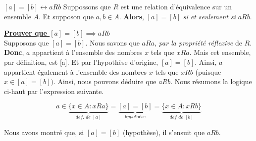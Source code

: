 \documentclass[16pt]{report}
\begin{document}
\begin{multicols*}{2}
            \begin{Theoremcon}{$[a] = [b]  \leftrightarrow aRb$ }
                Suppossons que $R$ est une relation d'équivalence sur un ensemble $A$. Et supposon que 
                $a, b \in A$. \textbf{Alors}, $[a] = [b]$ \textit{si et seulement si} $aRb$.     
            \end{Theoremcon}



                
            \begin{Preuve}{}{}
                \underline{\textbf{Prouver que $[a] = [b] \implies aRb$}}
                \vspace{1em}\\
                Supposons que $[a] = [b]$. Nous savons que $aRa$, \textit{par la propriété réflexive} de $R$. 
                \textbf{Donc}, $a$ appartient à l'ensemble des nombres $x$ tels que $xRa$. Mais cet ensemble, 
                par définition, est [a]. Et par l'hypothèse d'origine, $[a] = [b]$. Ainsi, 
                $a$ appartient également à l'ensemble des nombres $x$ tels que $xRb$ (puisque $x \in [a] = [b])$. 
                Ainsi, nous pouvons déduire que $aRb$. Nous résumons la logique ci-haut par l'expression 
                suivante.  

                \[ a \in \underbrace{\{ x \in A : xRa \}}_{\textit{def. de $[a]$}} = 
                    \underbrace{[a] = [b]}_{\textit{hypothèse}}  = 
                    \underbrace{\{ x \in A : xRb \}}_{\textit{def de $[b]$}} \]

                Nous avons montré que, si $[a] = [b]$ (hypothèse), il s'ensuit que $aRb$.
                \vspace{1em}
                \\




\end{Preuve}
\end{multicols*}
\end{document}
